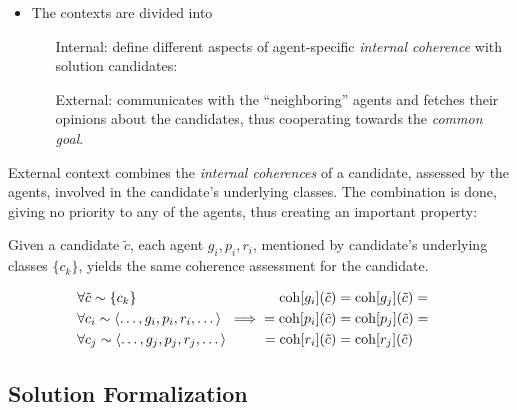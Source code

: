 \begin{itemize}
  \item The contexts are divided into
    \begin{itemize}[leftmargin=2cm]
      \item[Internal:] define different aspects of agent-specific \emph{internal coherence}
      with solution candidates:
      \item[External:] communicates with the ``neighboring'' agents and fetches
        their opinions about the candidates, thus cooperating towards the
        \emph{common goal}.
    \end{itemize}
 \end{itemize}

External context combines the \emph{internal coherences} of a candidate,
assessed by the agents, involved in the candidate's underlying classes.
The combination is done, giving no priority to any of the agents,
thus creating an important property:
\begin{displayquote}
  Given a candidate $\tilde{c}$, each agent $g_i, p_i, r_i$, mentioned by
  candidate's underlying classes $\{c_k\}$,
  yields the same coherence assessment for the candidate.
\end{displayquote}

\begin{align}
  \label{eq:coh-fun-independ}
  \begin{aligned}
    &\forall \tilde{c} \sim \{c_k\} \\
    &\forall c_i \sim \left< \dots, g_i, p_i, r_i, \dots \right> \\
    &\forall c_j \sim \left< \dots, g_j, p_j, r_j, \dots \right>
  \end{aligned}
& \implies
  \begin{aligned}
   \mathrm{coh}[g_i](\tilde c) &= \mathrm{coh}[g_j](\tilde c) = \\
   = \mathrm{coh}[p_i](\tilde c) &= \mathrm{coh}[p_j](\tilde c) = \\
   = \mathrm{coh}[r_i](\tilde c) &= \mathrm{coh}[r_j](\tilde c)
  \end{aligned}
\end{align}


\subsection{Solution Formalization}

